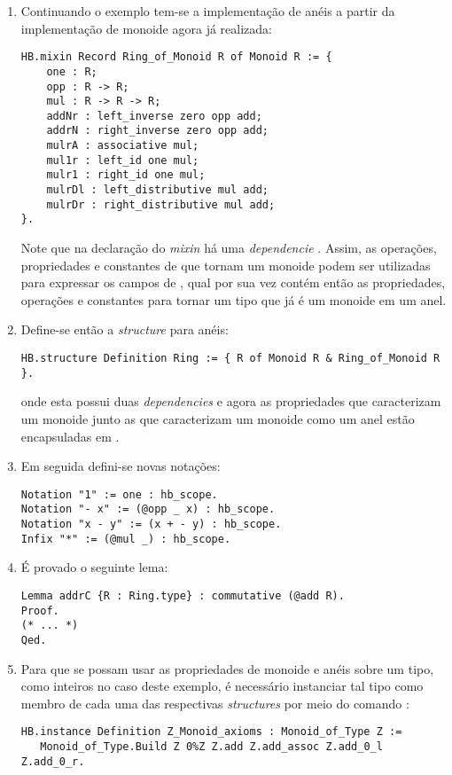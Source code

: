 {{\begin{enumerate}
        \item Continuando o exemplo tem-se a implementação de anéis a partir da implementação de monoide agora já realizada:
            \begin{lstlisting}[language=coq, frame=single, tabsize=1]
HB.mixin Record Ring_of_Monoid R of Monoid R := {
    one : R;
    opp : R -> R;
    mul : R -> R -> R;
    addNr : left_inverse zero opp add;
    addrN : right_inverse zero opp add;
    mulrA : associative mul;
    mul1r : left_id one mul;
    mulr1 : right_id one mul;
    mulrDl : left_distributive mul add;
    mulrDr : right_distributive mul add;
}.
            \end{lstlisting}    
        Note que na declaração do \textit{mixin} há uma \textit{dependencie} . Assim, as operações, propriedades e constantes de que tornam  um monoide podem ser utilizadas para expressar os campos de , qual por sua vez contém então as propriedades, operações e constantes para tornar um tipo que já é um monoide em um anel.
        
        \item Define-se então a \textit{structure} para anéis:
            \begin{lstlisting}[language=coq, frame=single, tabsize=1]
HB.structure Definition Ring := { R of Monoid R & Ring_of_Monoid R }.
            \end{lstlisting}
        onde esta possui duas \textit{dependencies} e agora as propriedades
        que caracterizam um monoide junto as que caracterizam um monoide como um anel estão encapsuladas em .

        \item Em seguida defini-se novas notações: 
            \begin{lstlisting}[language=coq, frame=single, tabsize=1]
Notation "1" := one : hb_scope.
Notation "- x" := (@opp _ x) : hb_scope.
Notation "x - y" := (x + - y) : hb_scope.
Infix "*" := (@mul _) : hb_scope.
            \end{lstlisting}

        \item É provado o seguinte lema:
            \begin{lstlisting}[language=coq, frame=single, tabsize=1]
Lemma addrC {R : Ring.type} : commutative (@add R).
Proof.
(* ... *)
Qed.
            \end{lstlisting}

        \item \label{item:inst} Para que se possam usar as propriedades de monoide e anéis sobre um tipo, como inteiros no caso deste exemplo, é necessário instanciar tal tipo como membro de cada uma das respectivas \textit{structures} por meio do comando :
            \begin{lstlisting}[language=coq, frame=single, tabsize=1]
HB.instance Definition Z_Monoid_axioms : Monoid_of_Type Z :=
   Monoid_of_Type.Build Z 0%Z Z.add Z.add_assoc Z.add_0_l Z.add_0_r.


\end{lstlisting}
\end{enumerate}}}
